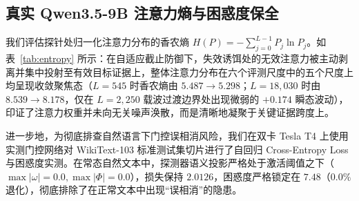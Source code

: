 \documentclass[11pt,a4paper]{article}
\theoremstyle{definition}
\begin{document}
\begin{table}[htbp]
\centering
\small
{}
\caption{\textbf{自回归单步解码时延与单层算子微基准开销表。} 在 $L=18,030$ 时端到端耗时维持在 $\approx 276\,\text{ms}$，单层算子微基准开销仅 $+1.8 \sim 2.1\,\mu\text{s}$。}
\label{tab:scaling}
\end{table}

\subsection{真实 Qwen3.5-9B 注意力熵与困惑度保全}
我们评估探针处归一化注意力分布的香农熵 $H(P) = -\sum_{j=0}^{L-1} P_j \ln P_j$。如表~\ref{tab:entropy} 所示：在自适应截止防御下，失效诱饵处的无效注意力被主动剥离并集中投射至有效目标证据上，整体注意力分布在六个评测尺度中的五个尺度上均呈现收敛聚焦态（$L=545$ 时香农熵由 $5.487\to 5.298$；$L=18,030$ 时由 $8.539\to 8.178$，仅在 $L=2,250$ 载波过渡边界处出现微弱的 $+0.174$ 瞬态波动），印证了注意力权重并未向无关噪声涣散，而是清晰地凝聚于关键证据跨度上。

进一步地，为彻底排查自然语言下门控误相消风险，我们在双卡 Tesla T4 上使用实测门控网络对 WikiText-103 标准测试集切片进行了自回归 Cross-Entropy Loss 与困惑度实测。在常态自然文本中，探测器语义投影严格处于激活阈值之下（$\max |\omega| = 0.0, \max |\Phi| = 0.0$），损失保持 $2.0126$，困惑度严格锁定在 $7.48$（$0.0\%$ 退化），彻底排除了在正常文本中出现“误相消”的隐患。


\end{document}
